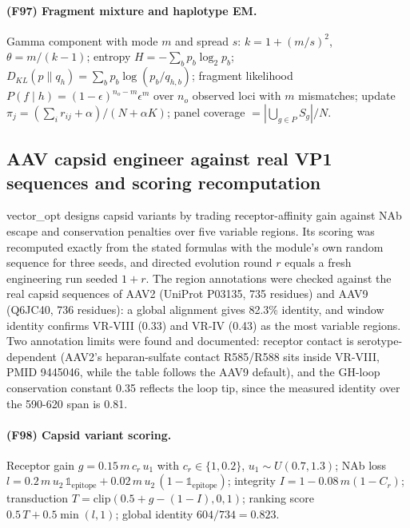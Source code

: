 \paragraph{(F97) Fragment mixture and haplotype EM.} Gamma component with mode $m$ and spread $s$: $k=1+(m/s)^2$, $\theta=m/(k-1)$; entropy $H=-\sum_b p_b\log_2 p_b$; $D_{KL}(p\|q_h)=\sum_b p_b\log(p_b/q_{h,b})$; fragment likelihood $P(f\mid h)=(1-\epsilon)^{n_o-m}\epsilon^{m}$ over $n_o$ observed loci with $m$ mismatches; update $\pi_j=(\sum_i r_{ij}+\alpha)/(N+\alpha K)$; panel coverage $=|\bigcup_{g\in P}S_g|/N$.
\subsection{AAV capsid engineer against real VP1 sequences and scoring recomputation}
vector\_opt designs capsid variants by trading receptor-affinity gain against NAb escape and conservation penalties over five variable regions. Its scoring was recomputed exactly from the stated formulas with the module's own random sequence for three seeds, and directed evolution round $r$ equals a fresh engineering run seeded $1+r$. The region annotations were checked against the real capsid sequences of AAV2 (UniProt P03135, 735 residues) and AAV9 (Q6JC40, 736 residues): a global alignment gives 82.3\% identity, and window identity confirms VR-VIII (0.33) and VR-IV (0.43) as the most variable regions. Two annotation limits were found and documented: receptor contact is serotype-dependent (AAV2's heparan-sulfate contact R585/R588 sits inside VR-VIII, PMID 9445046, while the table follows the AAV9 default), and the GH-loop conservation constant 0.35 reflects the loop tip, since the measured identity over the 590-620 span is 0.81.
\paragraph{(F98) Capsid variant scoring.} Receptor gain $g=0.15\,m\,c_r\,u_1$ with $c_r\in\{1,0.2\}$, $u_1\sim U(0.7,1.3)$; NAb loss $l=0.2\,m\,u_2\,\mathbb{1}_{\mathrm{epitope}}+0.02\,m\,u_2\,(1-\mathbb{1}_{\mathrm{epitope}})$; integrity $I=1-0.08\,m(1-C_r)$; transduction $T=\mathrm{clip}(0.5+g-(1-I),0,1)$; ranking score $0.5\,T+0.5\min(l,1)$; global identity $604/734=0.823$.
